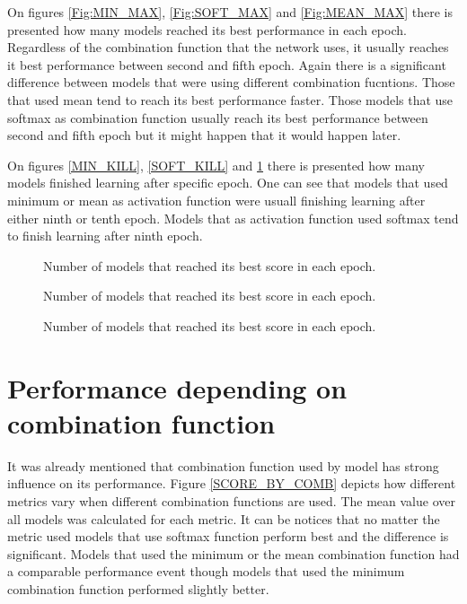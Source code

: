 \documentclass[a4paper,10pt]{report}
\begin{document}
    On figures \ref{Fig:MIN_MAX}, \ref{Fig:SOFT_MAX} and \ref{Fig:MEAN_MAX} there is presented how many models reached its best performance in each epoch. Regardless of the combination function that the network uses, it usually reaches it best performance between second and fifth epoch. Again there is a significant difference between models that were using different combination fucntions. Those that used mean tend to reach its best performance faster. Those models that use softmax as combination function usually reach its best performance between second and fifth epoch but it might happen that it would happen later. 

    On figures \ref{MIN_KILL}, \ref{SOFT_KILL} and \ref{MEAN_KILL} there is presented how many models finished learning after specific epoch. One can see that models that used minimum or mean as activation function were usuall finishing learning after either ninth or tenth epoch. Models that as activation function used softmax tend to finish learning after ninth epoch.
    
    \begin{figure}[!htb]\centering
      \begin{minipage}{\textwidth}
	\caption{Number of models that reached its best score in each epoch.}\label{SOFT_KILL}
      \end{minipage}
      
      \begin {minipage}{0.49\textwidth}
	\caption{Number of models that reached its best score in each epoch.}\label{MIN_KILL}
      \end{minipage}
      \begin {minipage}{0.49\textwidth}
	\caption{Number of models that reached its best score in each epoch.}\label{MEAN_KILL}
      \end{minipage}
    \end{figure}

    \section{Performance depending on combination function}
      It was already mentioned that combination function used by model has strong influence on its performance. Figure \ref{SCORE_BY_COMB} depicts how different metrics vary when different combination functions are used. The mean value over all models was calculated for each metric. It can be notices that no matter the metric used models that use softmax function perform best and the difference is significant. Models that used the minimum or the mean combination function had a comparable performance event though models that used the minimum combination function performed slightly better.
      
\end{document}
